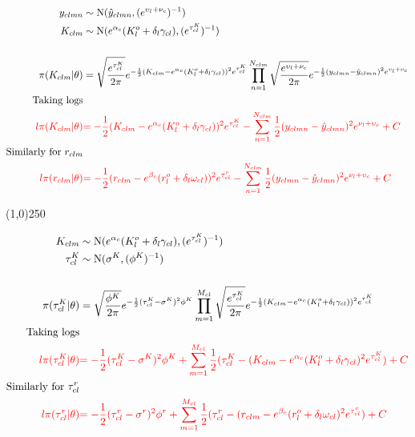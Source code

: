 \begin{align*}
y_{clmn} &\sim \operatorname{N}(\hat{y}_{clmn},(e^{ \upsilon_{l}+\nu_{c}  })^{-1} )\\ 
K_{clm} &\sim \operatorname{N}(e^{\alpha_{c}}(K_{l}^o+\delta_{l}\gamma_{cl}),(e^{ \tau_{cl}^K })^{-1})\\
\\
\pi(K_{clm}|\theta)&=\sqrt{\frac{e^{ \tau_{cl}^K }}{2\pi}} e^{-\frac{1}{2}(K_{clm}-e^{\alpha_{c}}(K_{l}^o+\delta_{l}\gamma_{cl}))^{2}e^{ \tau_{cl}^K } }
\prod_{n=1}^{N_{clm}}
\sqrt{\frac{
e^{ \upsilon_{l}+\nu_{c}}
}{2\pi}} e^{-\frac{1}{2}(
y_{clmn}-\hat{y}_{clmn}
)^{2} 
e^{ \upsilon_{l}+\nu_{c}}
}\\
\text{Taking logs}\\
\color{red}{l\pi(K_{clm}|\theta)}&
\color{red}{
=-\frac{1}{2}(K_{clm}-e^{\alpha_{c}}(K_{l}^o+\delta_{l}\gamma_{cl}))^{2}e^{\tau_{cl}^K}
-
\sum_{n=1}^{N_{clm}}\frac{1}{2}(y_{clmn}-\hat{y}_{clmn})^{2}e^{\nu_{l}+\upsilon_{c}}
+C
}
\\
\text{Similarly for $r_{clm}$}\\
\color{red}{l\pi(r_{clm}|\theta)}&
\color{red}{
=-\frac{1}{2}(r_{clm}-e^{\beta_{c}}(r_{l}^o+\delta_{l}\omega_{cl}))^{2}e^{\tau_{cl}^r}
-
\sum_{n=1}^{N_{clm}}\frac{1}{2}(y_{clmn}-\hat{y}_{clmn})^{2}e^{\nu_{l}+\upsilon_{c}}
+C
}
\end{align*}

\begin{center}
\line(1,0){250}
\end{center}

\begin{align*}
K_{clm} &\sim \operatorname{N}(e^{\alpha_{c}}(K_{l}^o+\delta_{l}\gamma_{cl}),(e^{ \tau_{cl}^K })^{-1})\\
\tau_{cl}^K &\sim \operatorname{N}(\sigma^{K}, (\phi^{K})^{-1} )\\
\\
\pi(\tau_{cl}^K |\theta)&=
\sqrt{\frac{\phi^{K}}{2\pi}} e^{-\frac{1}{2}(\tau_{cl}^K-\sigma^{K})^{2}\phi^{K} }
\prod_{m=1}^{M_{cl}}
\sqrt{\frac{
e^{ \tau_{cl}^K}
}{2\pi}} e^{-\frac{1}{2}(
K_{clm}-e^{\alpha_{c}}(K_{l}^o+\delta_{l}\gamma_{cl})
)^{2} 
e^{ \tau_{cl}^K}
}\\
\text{Taking logs}\\
\color{red}{l\pi(\tau_{cl}^K|\theta)}&
\color{red}{
=-\frac{1}{2}(\tau_{cl}^K-\sigma^{K})^{2}\phi^{K}
+
\sum_{m=1}^{M_{cl}}\frac{1}{2}(\tau_{cl}^K-(K_{clm}-e^{\alpha_{c}}(K_{l}^o+\delta_{l}\gamma_{cl})^{2}e^{\tau_{cl}^K})
+C}
\\
\text{Similarly for $\tau_{cl}^r$}\\
\color{red}{l\pi(\tau_{cl}^r|\theta)}&
\color{red}{
=-\frac{1}{2}(\tau_{cl}^r-\sigma^{r})^{2}\phi^{r}
+
\sum_{m=1}^{M_{cl}}\frac{1}{2}(\tau_{cl}^r-(r_{clm}-e^{\beta_{c}}(r_{l}^o+\delta_{l}\omega_{cl})^{2}e^{\tau_{cl}^r})
+C}
\end{align*}